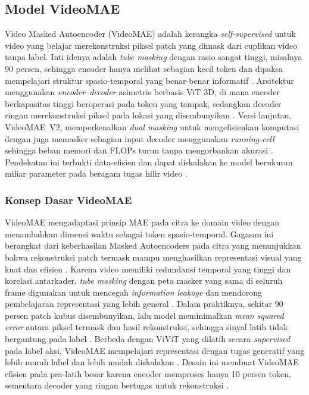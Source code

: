 \subsection{Model VideoMAE} \label{II.teori2.4}
Video Masked Autoencoder (VideoMAE) adalah kerangka \textit{self-supervised} untuk video yang belajar merekonstruksi piksel patch yang dimask dari cuplikan video tanpa label. Inti idenya adalah \textit{tube masking} dengan rasio sangat tinggi, misalnya 90 persen, sehingga encoder hanya melihat sebagian kecil token dan dipaksa mempelajari struktur spasio-temporal yang benar-benar informatif \cite{Tong2022VideoMAE}. Arsitektur menggunakan \textit{encoder--decoder} asimetris berbasis ViT 3D, di mana encoder berkapasitas tinggi beroperasi pada token yang tampak, sedangkan decoder ringan merekonstruksi piksel pada lokasi yang disembunyikan \cite{Tong2022VideoMAE}. Versi lanjutan, VideoMAE~V2, memperkenalkan \textit{dual masking} untuk mengefisienkan komputasi dengan juga memasker sebagian input decoder menggunakan \textit{running-cell} sehingga beban memori dan FLOPs turun tanpa mengorbankan akurasi \cite{Wang2023VideoMAEv2}. Pendekatan ini terbukti data-efisien dan dapat diskalakan ke model berukuran miliar parameter pada beragam tugas hilir video \cite{Wang2023VideoMAEv2}.

\subsubsection{Konsep Dasar VideoMAE} \label{II.teori2.4.1}
VideoMAE mengadaptasi prinsip MAE pada citra ke domain video dengan menambahkan dimensi waktu sebagai token spasio-temporal. Gagasan ini berangkat dari keberhasilan Masked Autoencoders pada citra yang menunjukkan bahwa rekonstruksi patch termask mampu menghasilkan representasi visual yang kuat dan efisien \cite{He2022MAE}. Karena video memiliki redundansi temporal yang tinggi dan korelasi antarkader, \textit{tube masking} dengan peta masker yang sama di seluruh frame digunakan untuk mencegah \textit{information leakage} dan mendorong pembelajaran representasi yang lebih general \cite{Tong2022VideoMAE}. Dalam praktiknya, sekitar 90 persen patch kubus disembunyikan, lalu model meminimalkan \textit{mean squared error} antara piksel termask dan hasil rekonstruksi, sehingga sinyal latih tidak bergantung pada label \cite{Tong2022VideoMAE}. Berbeda dengan ViViT yang dilatih secara \textit{supervised} pada label aksi, VideoMAE mempelajari representasi dengan tugas generatif yang lebih murah label dan lebih mudah diskalakan \cite{Arnab2021,Tong2022VideoMAE}. Desain ini membuat VideoMAE efisien pada pra-latih besar karena encoder memproses hanya 10 persen token, sementara decoder yang ringan bertugas untuk rekonstruksi \cite{Tong2022VideoMAE}.

